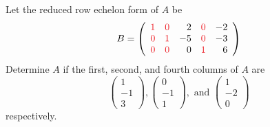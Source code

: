 \begin{exercise} \label{exercise 3.4.5}
Let the reduced row echelon form of \(A\) be
\[
    B = \left(\begin{array}{rrrrr}
        \RED{1} & \RED{0} & 2 & \RED{0} & -2 \\
        \RED{0} & \RED{1} & -5 & \RED{0} & -3 \\
        \RED{0} & \RED{0} & 0 & \RED{1} & 6
    \end{array}\right)
\]
Determine \(A\) if the first, second, and fourth columns of \(A\) are
\[
    \begin{pmatrix} 1 \\ -1 \\ 3 \end{pmatrix},
    \begin{pmatrix} 0 \\ -1 \\ 1 \end{pmatrix},
    \text { and }
    \begin{pmatrix} 1 \\ -2 \\ 0 \end{pmatrix}
\]
respectively.
\end{exercise}

